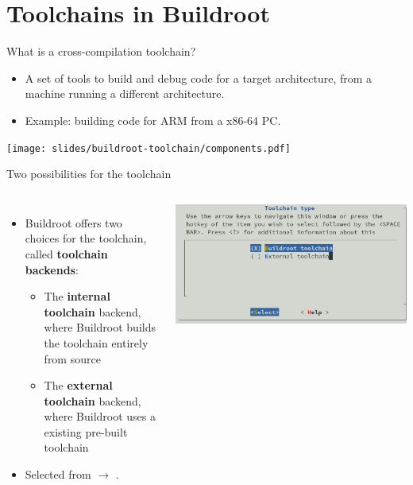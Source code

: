 \section{Toolchains in Buildroot}

\begin{frame}{What is a cross-compilation toolchain?}
  \begin{itemize}
  \item A set of tools to build and debug code for a target
    architecture, from a machine running a different architecture.
  \item Example: building code for ARM from a x86-64 PC.
  \end{itemize}
  \begin{center}
    \texttt{[image: slides/buildroot-toolchain/components.pdf]}
  \end{center}
\end{frame}

\begin{frame}{Two possibilities for the toolchain}
    \begin{columns}
    \begin{itemize}
    \item Buildroot offers two choices for the toolchain, called {\bf
        toolchain backends}:
      \begin{itemize}
      \item The {\bf internal toolchain} backend, where Buildroot builds
        the toolchain entirely from source
      \item The {\bf external toolchain} backend, where Buildroot uses a
        existing pre-built toolchain
      \end{itemize}
    \item Selected from  $\rightarrow$ .
    \end{itemize}
    \includegraphics[width=\textwidth]{slides/buildroot-toolchain/toolchain-types.png}
  \end{columns}
\end{frame}

